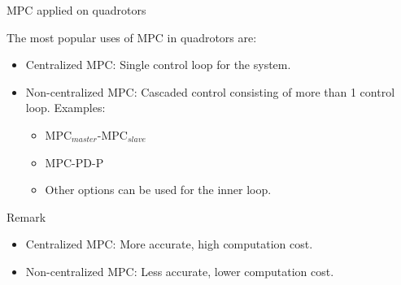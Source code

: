 \documentclass{thesisbeamer}
\newcommand\Fontvi{\fontsize{9}{10}\selectfont}
\begin{document}
\begin{frame}{MPC applied on quadrotors}
\Fontvi

The most popular uses of MPC in quadrotors are:

\begin{itemize} %
	\item Centralized MPC: Single control loop for the system.
	\item Non-centralized MPC: Cascaded control consisting of more than 1 control loop. Examples:
		\begin{itemize}
			\item MPC$_{master}$-MPC$_{slave}$
			\item MPC-PD-P
			\item Other options can be used for the inner loop.
		\end{itemize}
\end{itemize}

\begin{block}{Remark}
\begin{itemize}
	\item Centralized MPC: More accurate, high computation cost.
	\item Non-centralized MPC: Less accurate, lower computation cost. 
\end{itemize}
\end{block}

\end{frame}
\end{document}
